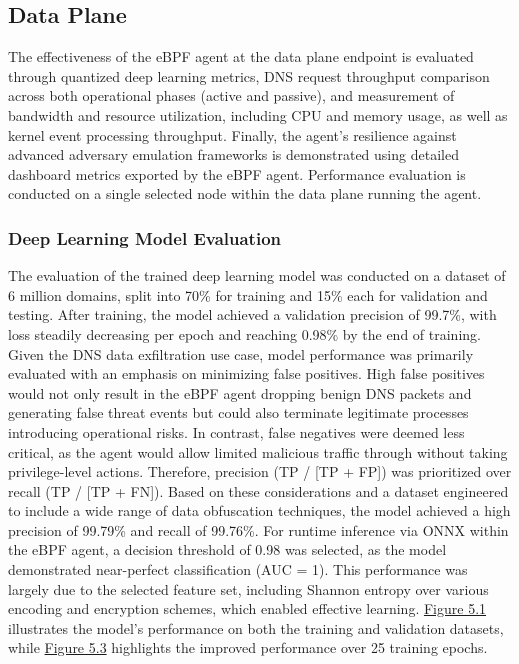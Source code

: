 \documentclass [11pt, proquest] {uwthesis}[2020/02/24]
\begin{document}
\subsection{Data Plane}
The effectiveness of the eBPF agent at the data plane endpoint is evaluated through quantized deep learning metrics, DNS request throughput comparison across both operational phases (active and passive), and measurement of bandwidth and resource utilization, including CPU and memory usage, as well as kernel event processing throughput. Finally, the agent’s resilience against advanced adversary emulation frameworks is demonstrated using detailed dashboard metrics exported by the eBPF agent. Performance evaluation is conducted on a single selected node within the data plane running the agent.

\subsubsection{Deep Learning Model Evaluation}
The evaluation of the trained deep learning model was conducted on a dataset of 6 million domains, split into 70\% for training and 15\% each for validation and testing. After training, the model achieved a validation precision of 99.7\%, with loss steadily decreasing per epoch and reaching 0.98\% by the end of training. Given the DNS data exfiltration use case, model performance was primarily evaluated with an emphasis on minimizing false positives. High false positives would not only result in the eBPF agent dropping benign DNS packets and generating false threat events but could also terminate legitimate  processes introducing operational risks. In contrast, false negatives were deemed less critical, as the agent would allow limited malicious traffic through without taking privilege-level actions. Therefore, precision (TP / [TP + FP]) was prioritized over recall (TP / [TP + FN]). Based on these considerations and a dataset engineered to include a wide range of data obfuscation techniques, the model achieved a high precision of 99.79\% and recall of 99.76\%. For runtime inference via ONNX within the eBPF agent, a decision threshold of 0.98 was selected, as the model demonstrated near-perfect classification (AUC = 1). This performance was largely due to the selected feature set, including Shannon entropy over various encoding and encryption schemes, which enabled effective learning. \hyperref[model-evaluation-metrics]{Figure 5.1} illustrates the model’s performance on both the training and validation datasets, while \hyperref[fig:model_metrics_quadrant]{Figure 5.3} highlights the improved performance over 25 training epochs.
\end{document}
